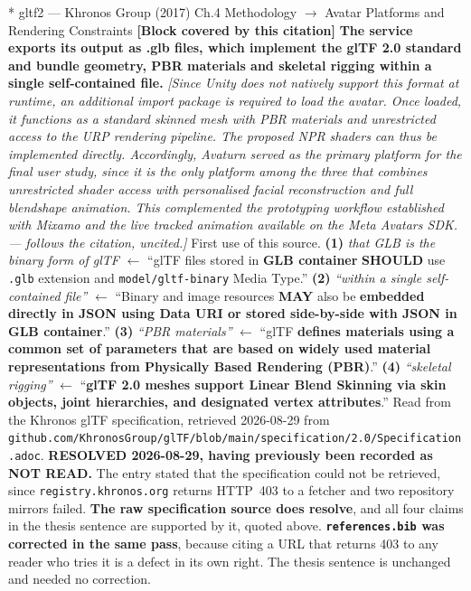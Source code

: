 \documentclass[11pt, a4paper]{article}
\makeatletter
\newcounter{citentry}
\newcommand{\citentry@core}[7]{%
  \stepcounter{citentry}
  \begingroup
  \sbox{\citentry@measurebox}{%
    \begin{minipage}{\linewidth}
      \noindent\colorbox{konstanzblue}{\parbox{\dimexpr\linewidth-2\fboxsep}{%
        \vspace{3pt}
        \textbf{\#\thecitentry \quad #2} \hfill \textit{#3}
        \vspace{3pt}
      }}
      \vspace{3pt}
      \noindent\begin{tabular}{@{}p{2.7cm} p{\dimexpr\linewidth-3cm}@{}}
        \textit{\small Sentence in thesis:} & #4 \\[5pt]
        \textbf{Usage:}\hfill       & #5 \\[5pt]
        \textit{\small Original source:}     & #6 \\[5pt]
        \textbf{How to check:}             & #7 \\
      \end{tabular}
      \vspace{5pt}
      \rule{10pt}{10pt}\quad \textbf{Validated} --- I have read the original and agree it supports the sentence.
    \end{minipage}%
  }%
  \Needspace{\dimexpr\ht\citentry@measurebox+\dp\citentry@measurebox\relax}%
  \endgroup
  \vspace{10pt}
  \noindent\colorbox{konstanzblue}{\parbox{\dimexpr\linewidth-2\fboxsep}{%
    \vspace{3pt}
    \textcolor{white}{\textbf{\#\thecitentry \quad #2}} \hfill \textcolor{white}{\textit{#3}}
    \vspace{3pt}
  }}
  \vspace{3pt}
  \noindent\begin{tabular}{@{}p{2.7cm} p{\dimexpr\linewidth-3cm}@{}}
    \textit{\small Sentence in thesis:} & \textcolor{darkgreen}{#4} \\[5pt]
    \textbf{Usage:}\hfill       & #5 \\[5pt]
    \textit{\small Original source:}     & \textcolor{darkred}{#6} \\[5pt]
    \textbf{How to check:}             & #7 \\
  \end{tabular}
  \vspace{5pt}
  \noindent\CheckBox[name=verified\thecitentry, width=10pt, height=10pt, bordercolor={0 0 0}, borderwidth=0.75, backgroundcolor={1 1 1}#1]{}\quad \textbf{Validated} --- I have read the original and agree it supports the sentence.
  \vspace{3pt}
  \noindent\textcolor{midgray}{\rule{\linewidth}{0.4pt}}
}
\newcommand{\citentry}{\@ifstar{\citentry@core{, checked}}{\citentry@core{}}}
\makeatother
\begin{document}
\begin{Form}
\citentry*
  {gltf2 --- Khronos Group (2017)}
  {Ch.4 Methodology $\rightarrow$ Avatar Platforms and Rendering Constraints}
  {\textbf{[Block covered by this citation]} \textbf{The service exports its output as .glb files, which implement the glTF 2.0 standard and bundle geometry, PBR materials and skeletal rigging within a single self-contained file.} \emph{[Since Unity does not natively support this format at runtime, an additional import package is required to load the avatar. Once loaded, it functions as a standard skinned mesh with PBR materials and unrestricted access to the URP rendering pipeline. The proposed NPR shaders can thus be implemented directly. Accordingly, Avaturn served as the primary platform for the final user study, since it is the only platform among the three that combines unrestricted shader access with personalised facial reconstruction and full blendshape animation. This complemented the prototyping workflow established with Mixamo and the live tracked animation available on the Meta Avatars SDK. --- follows the citation, uncited.]}}
  {First use of this source.}
  {\textbf{(1)} \emph{that GLB is the binary form of glTF} $\leftarrow$ ``glTF files stored in \textbf{GLB container} \textbf{SHOULD} use \texttt{.glb} extension and \texttt{model/gltf-binary} Media Type.'' \quad \textbf{(2)} \emph{``within a single self-contained file''} $\leftarrow$ ``Binary and image resources \textbf{MAY} also be \textbf{embedded directly in JSON using Data URI or stored side-by-side with JSON in GLB container}.'' \quad \textbf{(3)} \emph{``PBR materials''} $\leftarrow$ ``glTF \textbf{defines materials using a common set of parameters that are based on widely used material representations from Physically Based Rendering (PBR)}.'' \quad \textbf{(4)} \emph{``skeletal rigging''} $\leftarrow$ ``\textbf{glTF 2.0 meshes support Linear Blend Skinning via skin objects, joint hierarchies, and designated vertex attributes}.''}
  {Read from the Khronos glTF specification, retrieved 2026-08-29 from \texttt{\footnotesize github.com/KhronosGroup/glTF/blob/main/specification/2.0/Specification.adoc}. \textbf{RESOLVED 2026-08-29, having previously been recorded as NOT READ.} The entry stated that the specification could not be retrieved, since \texttt{registry.khronos.org} returns HTTP~403 to a fetcher and two repository mirrors failed. \textbf{The raw specification source does resolve}, and all four claims in the thesis sentence are supported by it, quoted above. \textbf{\texttt{references.bib} was corrected in the same pass}, because citing a URL that returns 403 to any reader who tries it is a defect in its own right. The thesis sentence is unchanged and needed no correction.}


\end{Form}
\end{document}
